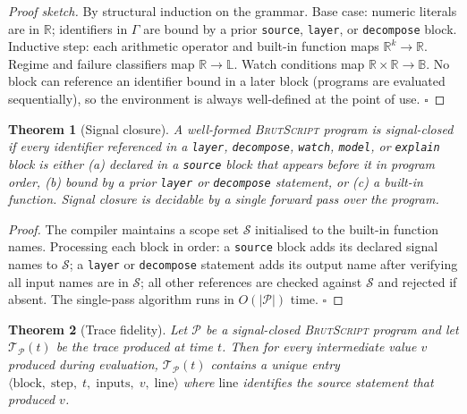 \documentclass[10pt,twocolumn,a4paper]{article}
\newtheorem{theorem}{Theorem}[section]
\theoremstyle{definition}
\theoremstyle{remark}
\newcommand{\BS}{\textsc{BrutScript}}
\begin{document}
\begin{proof}[Proof sketch]
By structural induction on the grammar.  Base case: numeric literals are
in $\mathbb{R}$; identifiers in $\Gamma$ are bound by a prior \texttt{source},
\texttt{layer}, or \texttt{decompose} block.  Inductive step: each
arithmetic operator and built-in function maps $\mathbb{R}^k \to \mathbb{R}$.
Regime and failure classifiers map $\mathbb{R} \to \mathbb{L}$.
Watch conditions map $\mathbb{R} \times \mathbb{R} \to \mathbb{B}$.
No block can reference an identifier bound in a later block (programs are
evaluated sequentially), so the environment is always well-defined at the
point of use. $\square$
\end{proof}

\begin{theorem}[Signal closure]
\label{thm:closure}
A well-formed \BS{} program is \emph{signal-closed} if every identifier
referenced in a \texttt{layer}, \texttt{decompose}, \texttt{watch},
\texttt{model}, or \texttt{explain} block is either (a) declared in a
\texttt{source} block that appears before it in program order, (b) bound
by a prior \texttt{layer} or \texttt{decompose} statement, or (c) a
built-in function.  Signal closure is decidable by a single forward pass
over the program.
\end{theorem}

\begin{proof}
The compiler maintains a scope set $\mathcal{S}$ initialised to the
built-in function names.  Processing each block in order: a
\texttt{source} block adds its declared signal names to $\mathcal{S}$;
a \texttt{layer} or \texttt{decompose} statement adds its output name
after verifying all input names are in $\mathcal{S}$; all other
references are checked against $\mathcal{S}$ and rejected if absent.
The single-pass algorithm runs in $O(|\mathcal{P}|)$ time.  $\square$
\end{proof}

\begin{theorem}[Trace fidelity]
\label{thm:fidelity}
Let $\mathcal{P}$ be a signal-closed \BS{} program and let
$\mathcal{T}_\mathcal{P}(t)$ be the trace produced at time $t$.  Then
for every intermediate value $v$ produced during evaluation,
$\mathcal{T}_\mathcal{P}(t)$ contains a unique entry
$\langle\mathrm{block},\;\mathrm{step},\;t,\;\mathrm{inputs},\;v,\;\mathrm{line}\rangle$
where $\mathrm{line}$ identifies the source statement that produced $v$.
\end{theorem}
\end{document}

